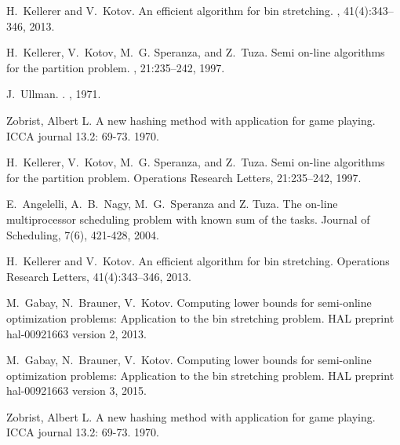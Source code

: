 \begin{thebibliography}{99}
H.~Kellerer and V.~Kotov.
\newblock An efficient algorithm for bin stretching.
, 41(4):343--346, 2013.

H.~Kellerer, V.~Kotov, M.~G. Speranza, and Z.~Tuza.
\newblock Semi on-line algorithms for the partition problem.
, 21:235--242, 1997.

J.~Ullman.
.
, 1971.

Zobrist, Albert L.
\newblock A new hashing method with application for game playing.
\newblock ICCA journal 13.2: 69-73.
1970.

H.~Kellerer, V.~Kotov, M.~G. Speranza, and Z.~Tuza.
\newblock Semi on-line algorithms for the partition problem.
\newblock Operations Research Letters, 21:235--242,
1997.

E.~Angelelli, A.~B.~Nagy, M.~G.~Speranza and Z. Tuza.
\newblock The on-line multiprocessor scheduling problem with known sum of the tasks.
\newblock Journal of Scheduling, 7(6), 421-428,
2004.

H.~Kellerer and V.~Kotov.
\newblock An efficient algorithm for bin stretching.
\newblock Operations Research Letters, 41(4):343--346,
2013.

M.~Gabay, N.~Brauner, V.~Kotov.
\newblock Computing lower bounds for semi-online optimization
problems: Application to the bin stretching problem. 
\newblock HAL preprint hal-00921663 version 2,
2013.

M.~Gabay, N.~Brauner, V.~Kotov.
\newblock Computing lower bounds for semi-online optimization
problems: Application to the bin stretching problem. 
\newblock HAL preprint hal-00921663 version 3,
2015.

Zobrist, Albert L.
\newblock A new hashing method with application for game playing.
\newblock ICCA journal 13.2: 69-73.
1970.


\end{thebibliography}